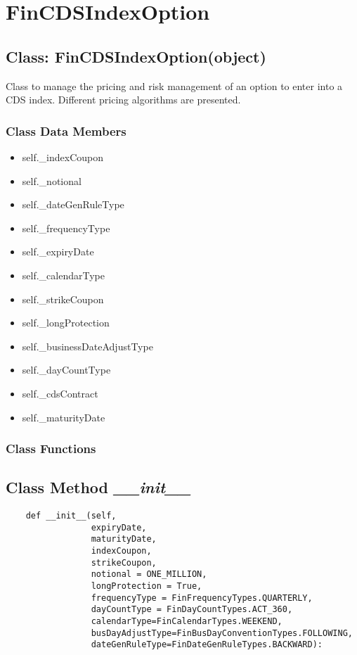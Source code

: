 \documentclass[twoside,11pt]{book}
\begin{document}
\newpage
\section{FinCDSIndexOption}

\subsection{Class: FinCDSIndexOption(object)}
Class to manage the pricing and risk management of an option to enter into a CDS index. Different pricing algorithms are presented. 

\subsubsection{Class Data Members}
\begin{itemize}
\item{self.\_indexCoupon}
\item{self.\_notional}
\item{self.\_dateGenRuleType}
\item{self.\_frequencyType}
\item{self.\_expiryDate}
\item{self.\_calendarType}
\item{self.\_strikeCoupon}
\item{self.\_longProtection}
\item{self.\_businessDateAdjustType}
\item{self.\_dayCountType}
\item{self.\_cdsContract}
\item{self.\_maturityDate}
\end{itemize}

\subsubsection{Class Functions}

\subsection{Class Method {\it \_\_init\_\_}}


\begin{lstlisting}
    def __init__(self,
                 expiryDate,
                 maturityDate,
                 indexCoupon,
                 strikeCoupon,
                 notional = ONE_MILLION,
                 longProtection = True,
                 frequencyType = FinFrequencyTypes.QUARTERLY,
                 dayCountType = FinDayCountTypes.ACT_360,
                 calendarType=FinCalendarTypes.WEEKEND,
                 busDayAdjustType=FinBusDayConventionTypes.FOLLOWING,
                 dateGenRuleType=FinDateGenRuleTypes.BACKWARD):
\end{lstlisting}
\end{document}
